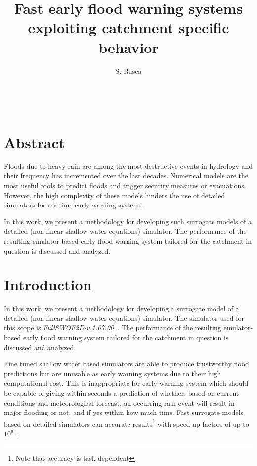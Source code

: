 \documentclass[12pt,a4paper,english,twocolumn,fleqn]{narms}
\begin{document}
\title{Fast early flood warning systems exploiting catchment specific behavior}
\author{{S. Rusca} \\
{} \\\\
{}\\
{}
} \maketitle


\section*{Abstract}

Floods due to heavy rain are among the most destructive events in hydrology and their frequency has incremented over the last decades.
Numerical models are the most useful tools to predict floods and trigger security measures or evacuations. However, the high complexity of these models hinders the use of detailed simulators for realtime early warning systems.

In this work, we present a methodology for developing such surrogate models of a detailed (non-linear shallow water equations) simulator.
The performance of the resulting emulator-based early flood warning system tailored for the catchment in question is discussed and analyzed.

\section{Introduction}

In this work, we present a methodology for developing a surrogate model of
a detailed (non-linear shallow water equations) simulator. The simulator used
for this scope is \textit{FullSWOF\textunderscore2D-v.1.07.00}~\citep{fullswof}.
The performance of the resulting emulator-based early flood warning system tailored for the catchment in question is discussed and analyzed.

Fine tuned shallow water based simulators are able to produce trustworthy flood predictions but are unusable as early warning systems due to their high computational cost.
This is  inappropriate for early warning system which should be capable of giving within seconds a prediction of whether, based on current conditions and meteorological forecast, an occurring rain event will result in major flooding or not, and if yes within how much time.
Fast surrogate models based on detailed simulators can accurate results\footnote{Note that accuracy is task dependent} with speed-up factors of up to $10^6$~\citep[see][for an application in geophysical hazards]{Bayarri2015}.
\end{document}
